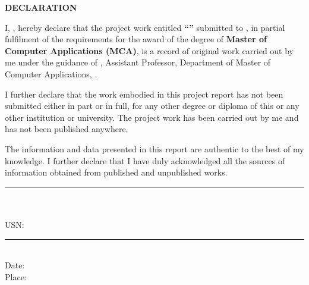 \thispagestyle{plain}
\begin{center}
  \vspace*{1cm}
  {\LARGE \textbf{DECLARATION}}\\[2cm]
\end{center}

\begin{center}
  \begin{minipage}{0.85\textwidth}
    \large

    \noindent I, \textbf{\studentName}, hereby declare that the project work entitled \textbf{``\projectTitle''} submitted to \collegeName, in partial fulfilment of the requirements for the award of the degree of \textbf{Master of Computer Applications (MCA)}, is a record of original work carried out by me under the guidance of \textbf{\guideName}, Assistant Professor, Department of Master of Computer Applications, \collegeName.

    \vspace{1cm}

    \noindent I further declare that the work embodied in this project report has not been submitted either in part or in full, for any other degree or diploma of this or any other institution or university. The project work has been carried out by me and has not been published anywhere.

    \vspace{1cm}

    \noindent The information and data presented in this report are authentic to the best of my knowledge. I further declare that I have duly acknowledged all the sources of information obtained from published and unpublished works.

    \vspace{3cm}

    \noindent\begin{minipage}{0.45\textwidth}
      \centering
      \rule{5cm}{0.5pt}\\
      \studentName\\
      USN: \usnNumber
    \end{minipage}
    \hfill
    \begin{minipage}{0.45\textwidth}
      \centering
      \rule{5cm}{0.5pt}\\
      Date:\\
      Place:
    \end{minipage}

  \end{minipage}
\end{center}
